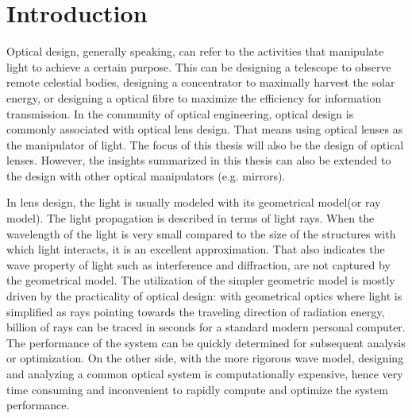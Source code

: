 \chapter{Introduction}
\label{chapter_1_intro}
\graphicspath{ {./chapter-sp/figures/} }
\captionsetup[figure]{labelfont=bf}
\captionsetup{margin=1.5em}
\captionsetup[table]{labelfont=bf}


Optical design, generally speaking, can refer to the activities that manipulate light to achieve a certain purpose. This can be designing a telescope to observe remote celestial bodies, designing a concentrator to maximally harvest the solar energy, or designing a optical fibre to maximize the efficiency for information transmission. In the community of optical engineering, optical design is commonly associated with optical lens design. That means using optical lenses as the manipulator of light. The focus of this thesis will also be the design of optical lenses. However, the insights summarized in this thesis can also be extended to the design with other optical manipulators (e.g. mirrors).

In lens design, the light is usually modeled with its geometrical model(or ray model). The light propagation is described in terms of light rays. When the wavelength of the light is very small compared to the size of the structures with which light interacts, it is an excellent approximation. That also indicates the wave property of light such as interference and diffraction, are not captured by the geometrical model. The utilization of the simpler geometric model is mostly driven by the practicality of optical design: with geometrical optics where light is simplified as rays pointing towards the traveling direction of radiation energy, billion of rays can be traced in seconds for a standard modern personal computer. The performance of the system can be quickly determined for subsequent analysis or optimization. On the other side, with the more rigorous wave model, designing and analyzing a common optical system is computationally expensive, hence very time consuming and inconvenient to rapidly compute and optimize the system performance. 


